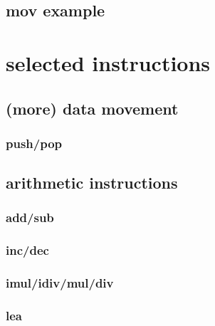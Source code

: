 

\subsection{mov example}




\section{selected instructions}

\subsection{(more) data movement}

\subsubsection{push/pop}



\subsection{arithmetic instructions}

\subsubsection{add/sub}



\subsubsection{inc/dec}



\subsubsection{imul/idiv/mul/div}



\subsubsection{lea}




